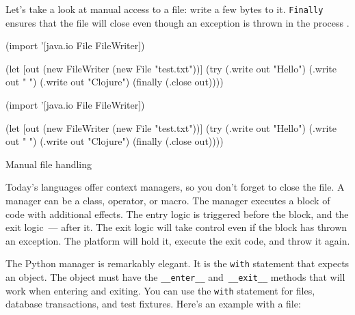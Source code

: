 Let's take a look at manual access to a file: write a few bytes to it. \verb|Finally| ensures that the file will close even though an exception is thrown in the process .

\begin{listing}[ht!]

\ifx\DEVICETYPE\MOBILE

\begin{english}
  \begin{clojure}
(import '[java.io File FileWriter])

(let [out (new FileWriter
            (new File "test.txt"))]
  (try
    (.write out "Hello")
    (.write out " ")
    (.write out "Clojure")
    (finally
      (.close out))))
  \end{clojure}
\end{english}

\else

\begin{english}
  \begin{clojure}
(import '[java.io File FileWriter])

(let [out (new FileWriter (new File "test.txt"))]
  (try
    (.write out "Hello")
    (.write out " ")
    (.write out "Clojure")
    (finally
      (.close out))))
  \end{clojure}
\end{english}

\fi

\caption{Manual file handling}
\label{fig:write-file}

\end{listing}

Today's languages offer context managers, so you don't forget to close the file. A manager can be a class, operator, or macro.
The manager executes a block of code with additional effects. The entry logic is triggered before the block, and the exit logic~--- after it. The exit logic will take control even if the block has thrown an exception.
The platform will hold it, execute the exit code, and throw it again.


The Python manager is remarkably elegant. It is the \verb|with| statement that expects an object. The object must have the \verb|__enter__| and~\verb|__exit__| methods that will work when entering and exiting. You can use the \verb|with| statement for files, database transactions, and test fixtures. Here's an example with a file:

